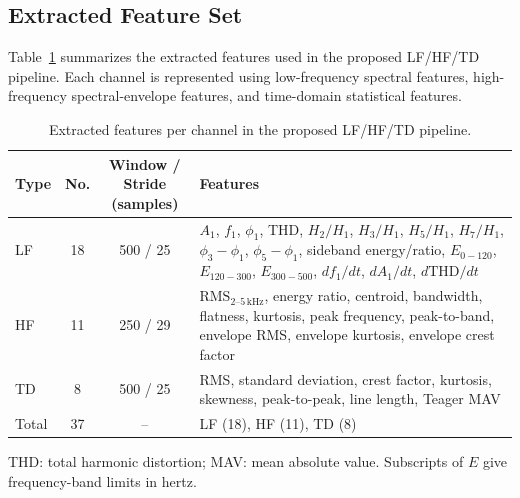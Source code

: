 \documentclass[letterpaper,journal]{IEEEtran}
\begin{document}
\subsection{Extracted Feature Set}
\label{app:feature_set}

Table~\ref{tab:app_extracted_features} summarizes the extracted features used in the proposed LF/HF/TD pipeline. Each channel is represented using low-frequency spectral features, high-frequency spectral-envelope features, and time-domain statistical features.

\begin{table}[t]
\centering
\scriptsize
\caption{Extracted features per channel in the proposed LF/HF/TD pipeline.}
\label{tab:app_extracted_features}
\setlength{\tabcolsep}{3pt}
\renewcommand{\arraystretch}{1.08}
\begin{tabularx}{\columnwidth}{l c c X}
\hline
Type & No. & \shortstack{Window / Stride\\(samples)} & Features \\
\hline
LF & 18 & 500 / 25 &
$A_1$, $f_1$, $\phi_1$, THD, $H_2/H_1$, $H_3/H_1$, $H_5/H_1$, $H_7/H_1$,
$\phi_3-\phi_1$, $\phi_5-\phi_1$, sideband energy/ratio,
$E_{0-120}$, $E_{120-300}$, $E_{300-500}$,
$df_1/dt$, $dA_1/dt$, $d\mathrm{THD}/dt$ \\
\hline
HF & 11 & 250 / 29 &
$\mathrm{RMS}_{2\text{--}5\,\mathrm{kHz}}$, energy ratio, centroid, bandwidth, flatness, kurtosis,
peak frequency, peak-to-band, envelope RMS, envelope kurtosis, envelope crest factor \\
\hline
TD & 8 & 500 / 25 &
RMS, standard deviation, crest factor, kurtosis, skewness, peak-to-peak, line length, Teager MAV \\
\hline
Total & 37 & -- & LF (18), HF (11), TD (8) \\
\hline
\end{tabularx}
\par\smallskip\raggedright
THD: total harmonic distortion; MAV: mean absolute value. Subscripts of $E$ give frequency-band limits in hertz.
\end{table}
\end{document}
